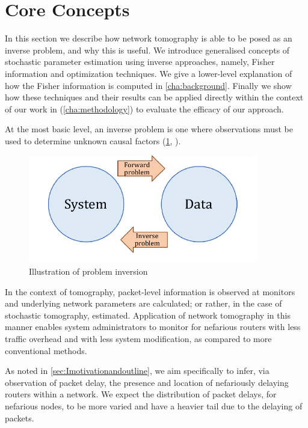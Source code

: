 \section{Core Concepts}
\label{sec:Icoreconcepts}

In this section we describe how network tomography is able to be posed as an inverse problem, and why this is useful. We introduce generalised concepts of stochastic parameter estimation using inverse approaches, namely, Fisher information and optimization techniques. We give a lower-level explanation of how the Fisher information is computed in \cref{cha:background}. Finally we show how these techniques and their results can be applied directly within the context of our work in (\cref{cha:methodology}) to evaluate the efficacy of our approach.

At the most basic level, an inverse problem is one where observations must be used to determine unknown causal factors (\cref{fig:probleminv}, \cite{sadri_effect_2019}).
\begin{figure}[H]
    \centering
    \includegraphics[width=10cm]{figs/intro/inverse_problems.png}
    \caption[Illustration of problem inversion]{Illustration of problem inversion \cite{sadri_effect_2019}}
    \label{fig:probleminv}
\end{figure}
In the context of tomography, packet-level information is observed at monitors and underlying network parameters are calculated; or rather, in the case of stochastic tomography, estimated. Application of network tomography in this manner enables system administrators to monitor for nefarious routers with less traffic overhead and with less system modification, as compared to more conventional methods.\par
As noted in \cref{sec:Imotivationandoutline}, we aim specifically to infer, via observation of packet delay, the presence and location of nefariously delaying routers within a network. We expect the distribution of packet delays, for nefarious nodes, to be more varied and have a heavier tail due to the delaying of packets.\par
